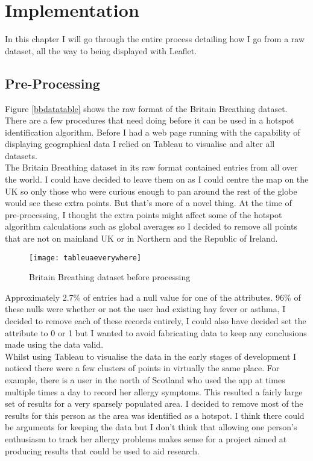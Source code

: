 \chapter{Implementation}
\label{cha:impl}

In this chapter I will go through the entire process detailing how I go from a raw dataset, all the way to being displayed with Leaflet.

\section{Pre-Processing}

Figure \ref{bbdatatable} shows the raw format of the Britain Breathing dataset. There are a few procedures that need doing before it can be used in a hotspot identification algorithm. Before I had a web page running with the capability of displaying geographical data I relied on Tableau to visualise and alter all datasets.\\ 

The Britain Breathing dataset in its raw format contained entries from all over the world. I could have decided to leave them on as I could centre the map on the UK so only those who were curious enough to pan around the rest of the globe would see these extra points. But that's more of a novel thing. At the time of pre-processing, I thought the extra points might affect some of the hotspot algorithm calculations such as global averages so I decided to remove all points that are not on mainland UK or in Northern and the Republic of Ireland.\\

\begin{figure}[H]
\begin{center}
\texttt{[image: tableuaeverywhere]}
\caption{Britain Breathing dataset before processing}
\label{fig:RTv1}
\end{center}
\end{figure}

Approximately 2.7\% of entries had a null value for one of the attributes. 96\% of these nulls were  whether or not the user had existing hay fever or asthma, I decided to remove each of these records entirely, I could also have decided set the attribute to 0 or 1 but I wanted to avoid fabricating data to keep any conclusions made using the data valid.\\

Whilst using Tableau to visualise the data in the early stages of development I noticed there were a few clusters of points in virtually the same place. For example, there is a user in the north of Scotland who used the app at times multiple times a day to record her allergy symptoms. This resulted a fairly large set of results for a very sparsely populated area. I decided to remove most of the results for this person as the area was identified as a hotspot. I think there could be arguments for keeping the data but I don't think that allowing one person's enthusiasm to track her allergy problems makes sense for a project aimed at producing results that could be used to aid research.\\


